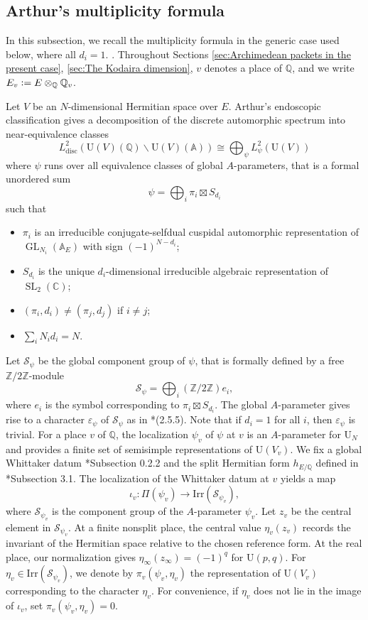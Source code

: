 \documentclass[11pt]{amsart}
\theoremstyle{plain}
\theoremstyle{definition}
\numberwithin{equation}{section}
\def\GL{\mathop{\mathrm{GL}}\nolimits}
\def\SL{\mathop{\mathrm{SL}}\nolimits}
\def\U{\mathrm{U}}
\newcommand{\bbA}{\mathbb{A}}
\newcommand{\bbC}{\mathbb{C}}
\newcommand{\bbQ}{\mathbb{Q}}
\newcommand{\bbZ}{\mathbb{Z}}
\newcommand{\calS}{\mathcal{S}}
\newcommand{\vep}{\varepsilon}
\newcommand{\Irr}{\mathrm{Irr}}
\newcommand{\disc}{\mathrm{disc}}
\newcommand{\defeq}{\vcentcolon=}
\begin{document}
\subsection{Arthur's multiplicity formula}

In this subsection, we recall the multiplicity formula in the generic
case used below, where all $d_i=1$. \cites{Mok_2015, KMSW}.
Throughout Sections \ref{sec:Archimedean packets in the present case}, \ref{sec:The Kodaira dimension}, $v$ denotes a place of $\bbQ$, and we write $E_v\defeq E\otimes_{\bbQ}\bbQ_v$.

Let $V$ be an $N$-dimensional Hermitian space over $E$.
Arthur's endoscopic classification gives a decomposition of the discrete automorphic spectrum into near-equivalence classes
\[
L^2_\disc(\U(V)(\bbQ)\backslash \U(V)(\bbA)) \cong \bigoplus_\psi L^2_\psi(\U(V))
\]
where $\psi$ runs over all equivalence classes of global $A$-parameters, that is a formal unordered sum
\[
\psi = \bigoplus_i \pi_i \boxtimes S_{d_i}
\]
such that
\begin{itemize}
    \item $\pi_i$ is an irreducible conjugate-selfdual cuspidal automorphic representation of $\GL_{N_i}(\bbA_E)$ with sign $(-1)^{N-d_i}$;

    \item $S_{d_i}$ is the unique $d_i$-dimensional irreducible algebraic representation of $\SL_2(\bbC)$;
    \item $(\pi_i, d_i) \neq (\pi_j, d_j)$ if $i \neq j$;
    \item $\sum_i N_id_i = N$.
\end{itemize}


Let $\calS_\psi$ be the global component group of $\psi$, that is formally defined by a free $\bbZ/2\bbZ$-module
\[
\calS_{\psi} = \bigoplus_i (\bbZ/2\bbZ)e_i,
\]
where $e_i$ is the symbol corresponding to $\pi_i \boxtimes S_{d_i}$.
The global $A$-parameter gives rise to a character $\vep_\psi$ of $\calS_\psi$ as in \cite{Mok_2015}*{(2.5.5)}.
Note that if $d_i = 1$ for all $i$, then $\vep_\psi$ is trivial.
For a place $v$ of $\bbQ$, the localization $\psi_v$ of $\psi$ at $v$ is an $A$-parameter for $\U_N$ and provides a finite set of semisimple representations of $\U(V_v)$.
We fix a global Whittaker datum \cite{KMSW}*{Subsection 0.2.2} and the split Hermitian form $h_{E/\bbQ}$ defined in \cite{2025_HMY_Kodaira_dimension_ball_quotients}*{Subsection 3.1}.
The localization of the Whittaker datum at $v$ yields a map
\[
\iota_v \colon \Pi(\psi_v) \rightarrow \Irr(\calS_{\psi_v}),
\]
where $\calS_{\psi_v}$ is the component group of the $A$-parameter $\psi_v$.
Let $z_v$ be the central element in $\calS_{\psi_v}$.
At a finite nonsplit place, the central value
$\eta_v(z_v)$ records the invariant of the Hermitian
space relative to the chosen reference form.
At the real place, our normalization gives
$\eta_\infty(z_\infty)=(-1)^q$ for $\U(p,q)$.
For $\eta_v \in \Irr(\calS_{\psi_v})$, we denote by $\pi_v(\psi_v, \eta_v)$ the representation of $\U(V_v)$ corresponding to the character $\eta_v$.
For convenience, if $\eta_v$ does not lie in the image of $\iota_v$, set $\pi_v(\psi_v,\eta_v)=0$.
\end{document}
